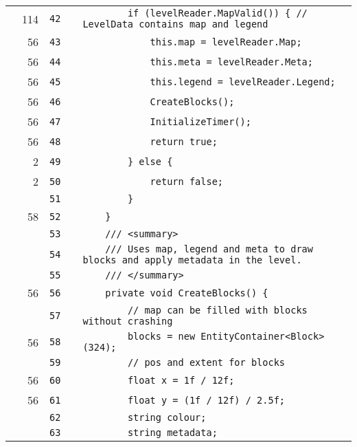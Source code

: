 \documentclass[a4paper,landscape,10pt]{article}
\begin{document}
\begin{longtable}[l]{lrrll}
\cellcolor{green} & 114 & \verb~42~ & & \verb~        if (levelReader.MapValid()) { // LevelData contains map and legend~\\
\cellcolor{green} & 56 & \verb~43~ & & \verb~            this.map = levelReader.Map;~\\
\cellcolor{green} & 56 & \verb~44~ & & \verb~            this.meta = levelReader.Meta;~\\
\cellcolor{green} & 56 & \verb~45~ & & \verb~            this.legend = levelReader.Legend;~\\
\cellcolor{green} & 56 & \verb~46~ & & \verb~            CreateBlocks();~\\
\cellcolor{green} & 56 & \verb~47~ & & \verb~            InitializeTimer();~\\
\cellcolor{green} & 56 & \verb~48~ & & \verb~            return true;~\\
\cellcolor{green} & 2 & \verb~49~ & & \verb~        } else {~\\
\cellcolor{green} & 2 & \verb~50~ & & \verb~            return false;~\\
\cellcolor{gray} &  & \verb~51~ & & \verb~        }~\\
\cellcolor{green} & 58 & \verb~52~ & & \verb~    }~\\
\cellcolor{gray} &  & \verb~53~ & & \verb~    /// <summary>~\\
\cellcolor{gray} &  & \verb~54~ & & \verb~    /// Uses map, legend and meta to draw blocks and apply metadata in the level.~\\
\cellcolor{gray} &  & \verb~55~ & & \verb~    /// </summary>~\\
\cellcolor{green} & 56 & \verb~56~ & & \verb~    private void CreateBlocks() {~\\
\cellcolor{gray} &  & \verb~57~ & & \verb~        // map can be filled with blocks without crashing~\\
\cellcolor{green} & 56 & \verb~58~ & & \verb~        blocks = new EntityContainer<Block>(324);~\\
\cellcolor{gray} &  & \verb~59~ & & \verb~        // pos and extent for blocks~\\
\cellcolor{green} & 56 & \verb~60~ & & \verb~        float x = 1f / 12f;~\\
\cellcolor{green} & 56 & \verb~61~ & & \verb~        float y = (1f / 12f) / 2.5f;~\\
\cellcolor{gray} &  & \verb~62~ & & \verb~        string colour;~\\
\cellcolor{gray} &  & \verb~63~ & & \verb~        string metadata;~\\

\end{longtable}
\end{document}
